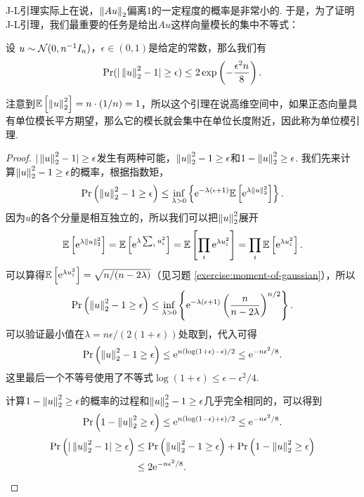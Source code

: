 J-L引理实际上在说，$\left\|Au\right\|_2$偏离$1$的一定程度的概率是非常小的. 于是，为了证明J-L引理，我们最重要的任务是给出$Au$这样向量模长的集中不等式：
\begin{lemma}[单位模引理]\label{lemma:unit-mod-lemma}
    设 $u\sim \mathcal{N}(0,n^{-1}I_n)$，$\epsilon \in (0,1 )$是给定的常数，那么我们有
    \[
        \Pr(|\left\|u\right\|_2^2 - 1| \geq \epsilon) \leq 2\exp \left(-\frac{\epsilon^2 n}{8}\right).
    \]
\end{lemma}
注意到$\mathbb{E}\left[\left\|u\right\|_2^2\right]=n\cdot(1/n)=1$，所以这个引理在说高维空间中，如果正态向量具有单位模长平方期望，那么它的模长就会集中在单位长度附近，因此称为单位模引理.

\begin{proof}
$|\left\|u\right\|_2^2 - 1| \geq \epsilon$发生有两种可能，$ \left\|u\right\|_2^2 - 1 \geq \epsilon$和$ 1 - \left\|u\right\|_2^2 \geq \epsilon$. 我们先来计算$ \left\|u\right\|_2^2 - 1 \geq \epsilon$的概率，根据指数矩，
    \[
    \Pr\left(\left\|u\right\|_2^2 - 1 \geq \epsilon\right) \leq \inf_{\lambda > 0} \left\{\mathrm{e}^{- \lambda (\epsilon + 1)} \mathbb{E} \left[\mathrm{e}^{\lambda \left\|u\right\|_2^2}\right]\right\}. 
    \]
因为$u$的各个分量是相互独立的，所以我们可以把$\left\|u\right\|_2^2$展开
    \[
    \mathbb{E}\left[\mathrm{e}^{\lambda \left\|u\right\|_2^2}\right] = \mathbb{E}\left[\mathrm{e}^{\lambda \sum_i u_i^2}\right] = \mathbb{E}\left[\prod_i \mathrm{e}^{\lambda u_i^2}\right] = \prod_i \mathbb{E}\left[\mathrm{e}^{\lambda u_i^2}\right]. 
    \]
可以算得$\mathbb{E}\left[\mathrm{e}^{\lambda u_i^2}\right]= \sqrt{n/(n-2\lambda)}$（见习题 \ref{exercise:moment-of-gaussian}），所以
    \[
    \Pr\left(\left\|u\right\|_2^2 - 1 \geq \epsilon\right) \leq \inf_{\lambda > 0} \left\{\mathrm{e}^{- \lambda (\epsilon + 1)} \left(\frac{n}{n-2\lambda} \right)^{n/2}\right\}. 
    \]
可以验证最小值在$\lambda = n\epsilon/(2(1+\epsilon))$处取到，代入可得
    \[
    \Pr\left(\left\|u\right\|_2^2 - 1 \geq \epsilon\right) \leq \mathrm{e}^{n(\log (1+\epsilon) - \epsilon)/2} \leq \mathrm{e}^{-n\epsilon^2/8}. 
    \]
这里最后一个不等号使用了不等式$\log(1+\epsilon)\leq\epsilon-\epsilon^2/4$. 

计算$1 - \left\|u\right\|_2^2 \geq \epsilon$的概率的过程和$\left\|u\right\|_2^2 - 1 \geq \epsilon$几乎完全相同的，可以得到
    \[
    \Pr\left(1 - \left\|u\right\|_2^2 \geq \epsilon\right) \leq \mathrm{e}^{n(\log (1-\epsilon) + \epsilon)/2} \leq \mathrm{e}^{-n\epsilon^2/8}. 
    \]
    \begin{align*}
        \Pr\left(| \left\|u\right\|_2^2 - 1| \geq \epsilon\right) &\leq \Pr\left(\left\|u\right\|_2^2 - 1 \geq \epsilon\right) + \Pr\left(1 - \left\|u\right\|_2^2 \geq \epsilon\right) \\
        &\leq 2\mathrm{e}^{-n\epsilon^2/8}. 
    \end{align*}
\end{proof}

